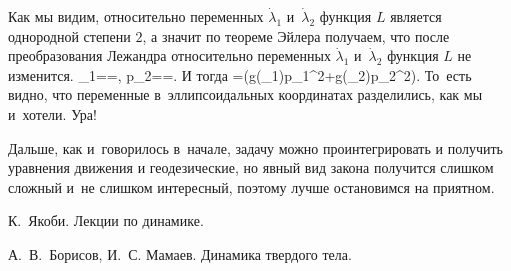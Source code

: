 \documentclass[a4paper,11pt]{article}
\def\[#1\]{\begin{align*}#1\end{align*}}
\begin{document}
Как мы видим, относительно переменных $\dot\lambda_1$ и~$\dot\lambda_2$
функция $L$ является однородной степени $2$, а значит по теореме Эйлера
получаем, что после преобразования Лежандра относительно переменных
$\dot\lambda_1$ и~$\dot\lambda_2$ функция $L$ не изменится.
	\[
	p_1==,
	\quad
	p_2==.
	\]
И тогда
	\[
	H=(g(\lambda_1)p_1^2+g(\lambda_2)p_2^2).
	\]
То~есть видно, что переменные в~эллипсоидальных координатах разделились, как мы
и~хотели. Ура!

Дальше, как и~говорилось в~начале, задачу можно проинтегрировать и получить
уравнения движения и геодезические, но явный вид закона получится слишком
сложный и~не слишком интересный, поэтому лучше остановимся на приятном.







\begin{thebibliography}{9}
\bibitem{}
К.~Якоби. Лекции по динамике.

\bibitem{}
А.~В.~Борисов, И.~С. Мамаев. Динамика твердого тела.
\end{thebibliography}
\end{document}
